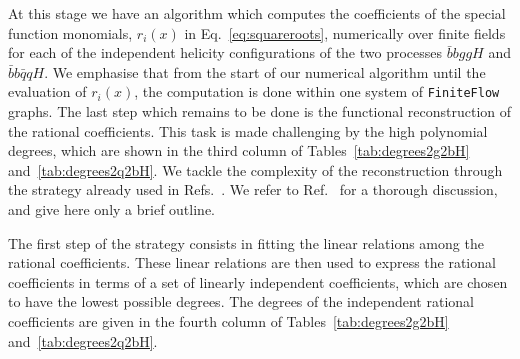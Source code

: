 \documentclass[main.tex]{subfiles}
\begin{document}
At this stage we have an algorithm which computes the coefficients of the special function monomials, $r_i(x)$ in Eq.~\eqref{eq:squareroots}, 
numerically over finite fields for each of the independent helicity configurations of the two processes $\bar{b}bggH$ and $\bar{b}b\bar{q}qH$. 
We emphasise that from the start of our numerical algorithm until the evaluation of $r_i(x)$, the computation is done within one system of \texttt{FiniteFlow} graphs.
The last step which remains to be done is the functional reconstruction of the rational coefficients. This task is made challenging by the high polynomial degrees, which are shown in the third column of Tables~\ref{tab:degrees2g2bH} and~\ref{tab:degrees2q2bH}. We tackle the complexity of the reconstruction through the strategy already used in Refs.~\cite{Badger:2021nhg,Badger:2021imn}. We refer to Ref.~\cite{Badger:2021imn} for a thorough discussion, and give here only a brief outline. 

The first step of the strategy consists in fitting the linear relations among the rational coefficients. These linear relations are then used to express the rational coefficients in terms of a set of linearly independent coefficients, which are chosen to have the lowest possible degrees. The degrees of the independent rational coefficients are given in the fourth column of Tables~\ref{tab:degrees2g2bH} and~\ref{tab:degrees2q2bH}.
\end{document}
